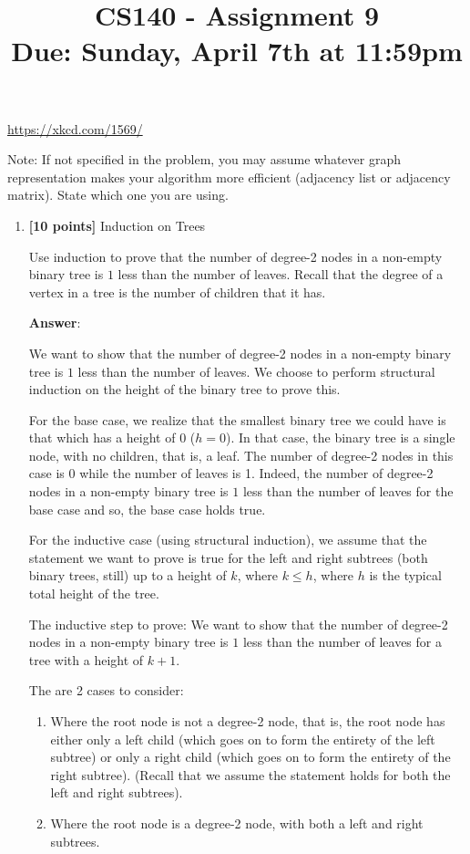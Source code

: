 \documentclass[11pt]{article}
\title{CS140 - Assignment 9\\\small{Due: Sunday, April 7th at 11:59pm}}
\author{}
\date{}
\begin{document}
\maketitle

\begin{center}

\footnotesize{\url{https://xkcd.com/1569/}}
\end{center}


Note:  If not specified in the problem, you may assume whatever graph representation makes your algorithm more efficient (adjacency list or adjacency matrix).  State which one you are using.

\begin{enumerate}

\item \textbf{[10 points]} Induction on Trees

Use induction to prove that the number of degree-2 nodes in a non-empty binary tree is $1$ less than the number of leaves. Recall that the degree of a vertex in a tree is the number of children that it has.

\textbf{Answer}:

We want to show that the number of degree-2 nodes in a non-empty binary tree is $1$ less than the number of leaves. We choose to perform structural induction on the height of the binary tree to prove this.

For the base case, we realize that the smallest binary tree we could have is that which has a height of 0 ($h=0$). In that case, the binary tree is a single node, with no children, that is, a leaf. The number of degree-2 nodes in this case is 0 while the number of leaves is 1. Indeed, the number of degree-2 nodes in a non-empty binary tree is $1$ less than the number of leaves for the base case and so, the base case holds true.

For the inductive case (using structural induction), we assume that the statement we want to prove is true for the left and right subtrees (both binary trees, still) up to a height of $k$, where $k \le h$, where $h$ is the typical total height of the tree.

The inductive step to prove: We want to show that the number of degree-2 nodes in a non-empty binary tree is $1$ less than the number of leaves for a tree with a height of $k+1$.

The are 2 cases to consider:
\begin{enumerate}
    \item Where the root node is not a degree-2 node, that is, the root node has either only a left child (which goes on to form the entirety of the left subtree) or only a right child (which goes on to form the entirety of the right subtree). (Recall that we assume the statement holds for both the left and right subtrees).
    \item Where the root node is a degree-2 node, with both a left and right subtrees.
\end{enumerate}


\end{enumerate}
\end{document}
